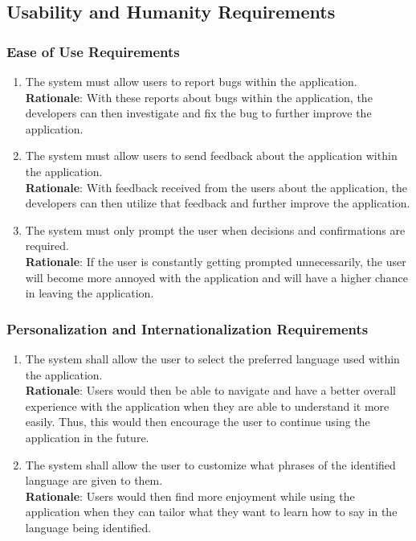 

\subsection{Usability and Humanity Requirements}
\label{sub:usability_and_humanity_requirements}

\subsubsection{Ease of Use Requirements}
\label{ssub:ease_of_use_requirements}
\begin{enumerate}[{UH-EOU}1. ]
	\item The system must allow users to report bugs within the application.\\ \textbf{Rationale}: With these reports about bugs within the application, the developers can then investigate and fix the bug to further improve the application.
	\item The system must allow users to send feedback about the application within the application.\\ \textbf{Rationale}: With feedback received from the users about the application, the developers can then utilize that feedback and further improve the application.
	\item The system must only prompt the user when decisions and confirmations are required.\\ \textbf{Rationale}: If the user is constantly getting prompted unnecessarily, the user will become more annoyed with the application and will have a higher chance in leaving the application.
\end{enumerate}


\subsubsection{Personalization and Internationalization Requirements}
\label{ssub:personalization_and_internationalization_requirements}
\begin{enumerate}[{UH-PI}1. ]
	\item The system shall allow the user to select the preferred language used within the application.\\ \textbf{Rationale}: Users would then be able to navigate and have a better overall experience with the application when they are able to understand it more easily. Thus, this would then encourage the user to continue using the application in the future.
	\item The system shall allow the user to customize what phrases of the identified language are given to them.\\ \textbf{Rationale}: Users would then find more enjoyment while using the application when they can tailor what they want to learn how to say in the language being identified.
\end{enumerate}


